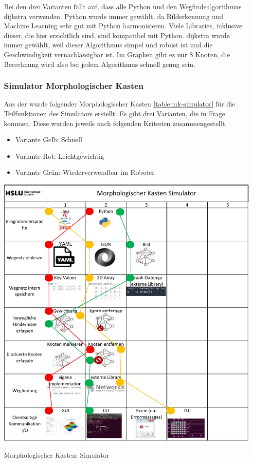 Bei den drei Varianten fällt auf, dass alle Python und den Wegfindealgorithmus \gls{dijkstra} verwenden. Python wurde immer gewählt, da Bilderkennung und Machine Learning sehr gut mit Python harmonisieren. Viele Libraries, inklusive dieser, die hier ersichtlich sind, sind kompatibel mit Python. \gls{dijkstra} wurde immer gewählt, weil dieser Algorithmus simpel und robust ist und die Geschwindigkeit vernachlässigbar ist. Im Graphen gibt es nur 8 Knoten, die Berechnung wird also bei jedem Algorithmus schnell genug sein.

\subsubsection*{Simulator Morphologischer Kasten}\label{mk-simulator}



Aus der  wurde folgender Morphologischer Kasten \ref{table:mk-simulator} für die Teilfunktionen des Simulators erstellt. Es gibt drei Varianten, die in Frage kommen. Diese wurden jeweils nach folgenden Kriterien zusammengestellt.

\begin{itemize}
    \item Variante Gelb: Schnell
    \item Variante Rot: Leichtgewichtig
    \item Variante Grün: Wiederverwendbar im Roboter
\end{itemize}


\begin{table}[H]
\centering
\includegraphics[width=\textwidth]{assets/MK_Simulator.pdf}
\caption{Morphologischer Kasten: Simulator}
\label{table:mk-simulator}
\end{table}



